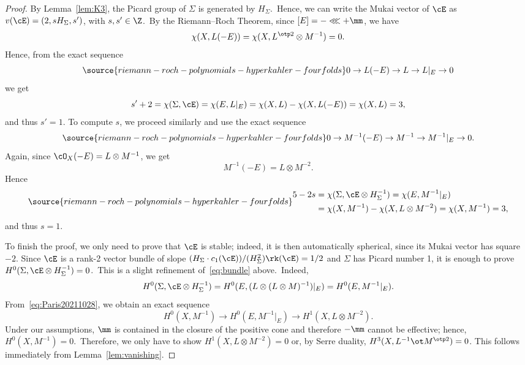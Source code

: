 \begin{proof}
By Lemma~\ref{lem:K3}, the Picard group of $\Sigma$ is generated by $H_\Sigma$.\
Hence, we can write  the Mukai vector of $\cE$ as $v(\cE)=(2,s H_\Sigma, s')$, with $s,s'\in\Z$.\
By the Riemann--Roch Theorem, since $[E]=-\lll+\mm$, we have
\[
\chi(X,L (-E))=\chi(X,L^{\otp 2}\otimes M^{-1})=0.
\]
Hence, from the exact sequence
\begin{equation}\label{eq:Paris20211029}
\source{riemann-roch-polynomials-hyperkahler-fourfolds}
0\to L (-E) \to L \to L \vert_E \to 0
\end{equation}
we get
\[
s'+2 = \chi(\Sigma,\cE) = \chi(E,L \vert_E) = \chi(X,L) - \chi(X,L (-E)) = \chi(X,L) = 3,
\]
and thus $s'=1$.
To compute $s$, we proceed similarly and use the exact sequence
\begin{equation}\label{eq:Paris20211028}
\source{riemann-roch-polynomials-hyperkahler-fourfolds}
0\to M^{-1}  (-E) \to M^{-1} \to M^{-1} \vert_E \to 0.
\end{equation}
Again, since $\cO_X(-E)=L \otimes M^{-1}$, we get
\[
M^{-1} (-E) = L\otimes M^{-2}.
\]
Hence
\begin{equation}\label{eq:bundle}
\source{riemann-roch-polynomials-hyperkahler-fourfolds}
\begin{split}
5 - 2s & = \chi(\Sigma,\cE \otimes H_\Sigma^{-1}) = \chi(E,M^{-1} \vert_E) \\
& = \chi(X,M^{-1}) - \chi(X,L\otimes M^{-2}) = \chi(X,M^{-1}) = 3,
\end{split}
\end{equation}
and thus $s=1$.

To finish the proof, we only need to prove that $\cE$ is stable; indeed, it is then automatically spherical, since its Mukai vector has square  $-2$.
Since $\cE$ is a rank-2 vector bundle of slope $(H_\Sigma\cdot c_1(\cE))/(H_\Sigma^2)\rk(\cE)=1/2$ and $\Sigma$ has Picard number 1, it is enough to prove   \mbox{$H^0(\Sigma,\cE\otimes H_\Sigma^{-1})=0$.}\
This is a slight refinement of~\eqref{eq:bundle} above.\
Indeed,
\[
H^0(\Sigma,\cE\otimes H_\Sigma^{-1})=H^0(E,(L\otimes (L\otimes M)^{-1})\vert_E)=H^0(E,M^{-1} \vert_E).
\]
From~\eqref{eq:Paris20211028}, we obtain an exact sequence
\[
H^0(X,M^{-1}) \to H^0(E,M^{-1} \vert_E) \to H^1(X,L\otimes M^{-2}).
\]
Under our assumptions, $\mm$ is contained in the closure of the positive cone and therefore $-\mm$ cannot be effective; hence, $H^0(X,M^{-1})=0$.\
Therefore, we only have to show  $H^1(X,L\otimes M^{-2})=0$ or, by Serre duality,  $H^3(X,  L^{-1}\ot M^{\otp 2})=0$.
This follows immediately from Lemma~\ref{lem:vanishing}.
\end{proof}

